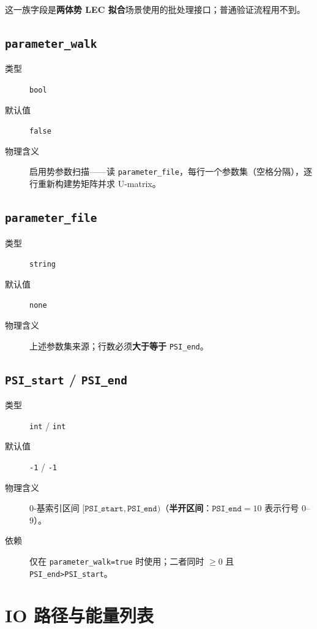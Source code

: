 这一族字段是\textbf{两体势 LEC 拟合}场景使用的批处理接口；普通验证流程用不到。

\subsection{\texttt{parameter\_walk}}

\begin{description}
  \item[类型] \texttt{bool}
  \item[默认值] \texttt{false}
  \item[物理含义] 启用势参数扫描——读 \texttt{parameter\_file}，每行一个参数集（空格分隔），逐行重新构建势矩阵并求 U-matrix。
\end{description}

\subsection{\texttt{parameter\_file}}

\begin{description}
  \item[类型] \texttt{string}
  \item[默认值] \texttt{none}
  \item[物理含义] 上述参数集来源；行数必须\textbf{大于等于} \texttt{PSI\_end}。
\end{description}

\subsection{\texttt{PSI\_start} / \texttt{PSI\_end}}

\begin{description}
  \item[类型] \texttt{int} / \texttt{int}
  \item[默认值] \texttt{-1} / \texttt{-1}
  \item[物理含义] 0-基索引区间 \([\texttt{PSI\_start},\texttt{PSI\_end})\)（\textbf{半开区间}：\(\texttt{PSI\_end}=10\) 表示行号 \(0\)–\(9\)）。
  \item[依赖] 仅在 \texttt{parameter\_walk=true} 时使用；二者同时 \(\ge 0\) 且 \texttt{PSI\_end>PSI\_start}。
\end{description}

\section{IO 路径与能量列表}
\label{sec:appE_io}

